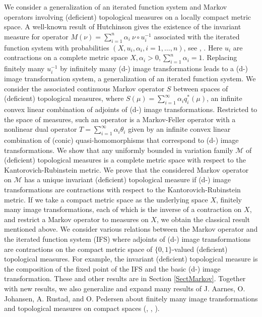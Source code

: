 \documentclass[sn-mathphys-num]{sn-jnl}%
\theoremstyle{thmstyleone}%
\theoremstyle{definition}
\begin{document}
We consider a generalization of an iterated function system and 
Markov operators involving (deficient) topological measures on a locally compact metric space.
A well-known result of Hutchinson gives the existence of the invariant measure for operator  
$M(\nu) = \sum_{i=1}^n \alpha_i  \  \nu \circ u_i^{-1}$ associated with the iterated function system with probabilities $(X, u_i, \alpha_i, i=1, \ldots, n)$,
see   \cite{Hutchinson}, \cite[Ch. IX]{Barnsley}.
Here $u_i$ are contractions on a complete metric space $X,   \alpha_i > 0,  \sum_{i=1}^n \alpha_i = 1$. 
Replacing finitely many $u_i^{-1}$ by infinitely many (d-) image transformations 
leads to a (d-) image transformation system, a generalization of an iterated function system. 
We consider the associated continuous Markov operator $S$ between spaces of (deficient) topological measures, 
where  $S(\mu) = \sum_{i=1}^\infty \alpha_i q_i^* (\mu)$, 
an infinite convex linear combination of adjoints of (d-) image transformations. 
Restricted to the space of measures, 
such an operator is a Markov-Feller operator with a nonlinear dual operator
$T = \sum_{i=1}^\infty \alpha_i \theta_i$
 given by an infinite convex linear combination of (conic) quasi-homomorphisms that correspond to (d-) image transformations.
We show that any uniformly bounded in variation family $\mathcal{M}$ of (deficient) topological measures is a complete metric space with respect to the 
Kantorovich-Rubinstein metric. We prove that the considered Markov operator on $\mathcal{M}$ 
has a unique invariant (deficient) topological measure if (d-) image transformations are contractions 
with respect to the Kantorovich-Rubinstein metric.
If we take a compact metric space as the underlying space $X$,  finitely many image transformations, 
each of which is the inverse of a contraction on $X$, and
restrict a Markov operator to measures on $X$, we obtain the classical result mentioned above.
We consider various relations between the Markov operator 
and the iterated function system (IFS) where adjoints of (d-) image transformations are contractions on 
the compact metric space of $\{0,1\}$-valued (deficient) topological measures. For example, the invariant (deficient) topological measure 
is the composition of the fixed point of the IFS and the basic (d-) image transformation. 
These and other results are in Section \ref{SectMarkov}. Together with new results, we also generalize and expand many results of
J. Aarnes, O. Johansen,  A. Rustad, and O. Pedersen  
about finitely many image transformations and topological measures on compact spaces 
(\cite{Aarnes:ITfirst}, \cite{AarnesJohansenRustad}, \cite{Pedersen}).
\end{document}
